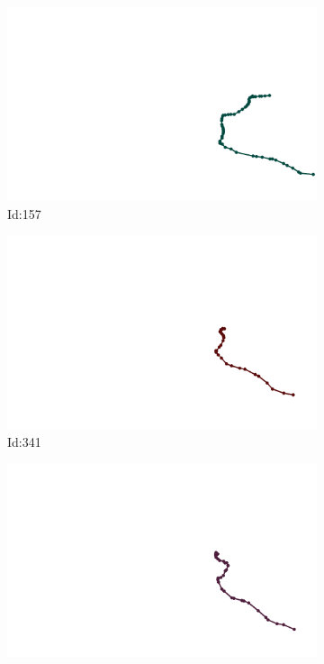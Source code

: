 \documentclass[12pt,twoside]{report}
\begin{document}
\begin{figure}
\centering
\begin{subfigure}[b]{0.20\textwidth}
\centering
\includegraphics[width=\textwidth]{../../trajectories/157.png}
\caption{Id:157}
\end{subfigure}
\begin{subfigure}[b]{0.20\textwidth}
\centering
\includegraphics[width=\textwidth]{../../trajectories/341.png}
\caption{Id:341}
\end{subfigure}
\begin{subfigure}[b]{0.20\textwidth}
\centering
\includegraphics[width=\textwidth]{../../trajectories/351.png}

\end{subfigure}
\end{figure}
\end{document}
